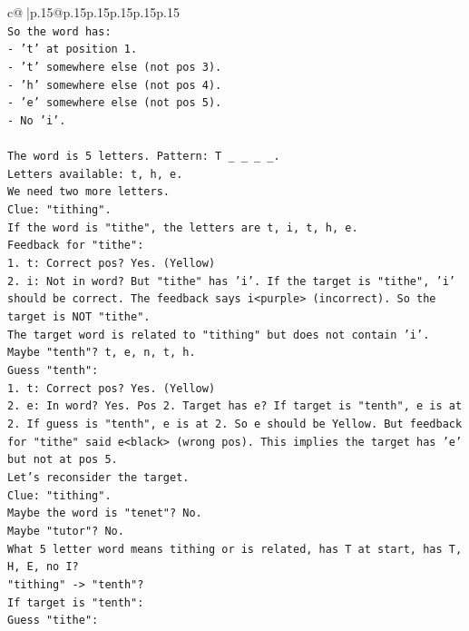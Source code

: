 \documentclass{article}
\begin{document}
{\begin{supertabular}{c@{$\;$}|p{.15\linewidth}@{}p{.15\linewidth}p{.15\linewidth}p{.15\linewidth}p{.15\linewidth}p{.15\linewidth}}
{{{\\ 
\texttt{So the word has:} \\
\texttt{{-} 't' at position 1.} \\
\texttt{{-} 't' somewhere else (not pos 3).} \\
\texttt{{-} 'h' somewhere else (not pos 4).} \\
\texttt{{-} 'e' somewhere else (not pos 5).} \\
\texttt{{-} No 'i'.} \\
\\ 
\texttt{The word is 5 letters. Pattern: T \_ \_ \_ \_.} \\
\texttt{Letters available: t, h, e.} \\
\texttt{We need two more letters.} \\
\texttt{Clue: "tithing".} \\
\texttt{If the word is "tithe", the letters are t, i, t, h, e.} \\
\texttt{Feedback for "tithe":} \\
\texttt{1. t: Correct pos? Yes. (Yellow)} \\
\texttt{2. i: Not in word? But "tithe" has 'i'. If the target is "tithe", 'i' should be correct. The feedback says i<purple> (incorrect). So the target is NOT "tithe".} \\
\texttt{The target word is related to "tithing" but does not contain 'i'.} \\
\texttt{Maybe "tenth"? t, e, n, t, h.} \\
\texttt{Guess "tenth":} \\
\texttt{1. t: Correct pos? Yes. (Yellow)} \\
\texttt{2. e: In word? Yes. Pos 2. Target has e? If target is "tenth", e is at 2. If guess is "tenth", e is at 2. So e should be Yellow. But feedback for "tithe" said e<black> (wrong pos). This implies the target has 'e' but not at pos 5.} \\
\texttt{Let's reconsider the target.} \\
\texttt{Clue: "tithing".} \\
\texttt{Maybe the word is "tenet"? No.} \\
\texttt{Maybe "tutor"? No.} \\
\texttt{What 5 letter word means tithing or is related, has T at start, has T, H, E, no I?} \\
\texttt{"tithing" {-}> "tenth"?} \\
\texttt{If target is "tenth":} \\
\texttt{Guess "tithe":} \\
}}}
\end{supertabular}}
\end{document}
